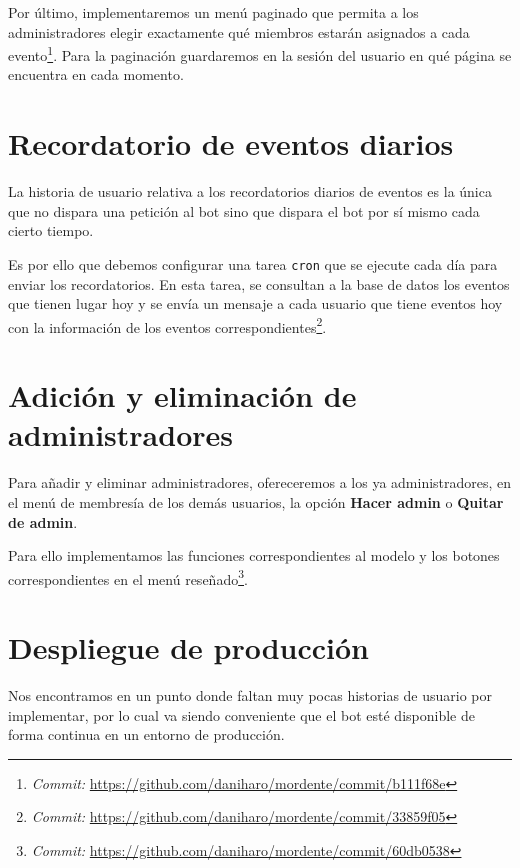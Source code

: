 Por último, implementaremos un menú paginado que permita a los administradores elegir exactamente qué miembros estarán asignados a cada evento\footnote{\textit{Commit:} \url{https://github.com/daniharo/mordente/commit/b111f68e}}. Para la paginación guardaremos en la sesión del usuario en qué página se encuentra en cada momento.

\section{Recordatorio de eventos diarios}

La historia de usuario relativa a los recordatorios diarios de eventos es la única que no dispara una petición al bot sino que dispara el bot por sí mismo cada cierto tiempo.

Es por ello que debemos configurar una tarea \texttt{cron} que se ejecute cada día para enviar los recordatorios. En esta tarea, se consultan a la base de datos los eventos que tienen lugar hoy y se envía un mensaje a cada usuario que tiene eventos hoy con la información de los eventos correspondientes\footnote{\textit{Commit:} \url{https://github.com/daniharo/mordente/commit/33859f05}}.




\section{Adición y eliminación de administradores}

Para añadir y eliminar administradores, ofereceremos a los ya administradores, en el menú de membresía de los demás usuarios, la opción \textbf{Hacer admin} o \textbf{Quitar de admin}.

Para ello implementamos las funciones correspondientes al modelo y los botones correspondientes en el menú reseñado\footnote{\textit{Commit:} \url{https://github.com/daniharo/mordente/commit/60db0538}}.




\section{Despliegue de producción}

Nos encontramos en un punto donde faltan muy pocas historias de usuario por implementar, por lo cual va siendo conveniente que el bot esté disponible de forma continua en un entorno de producción.

